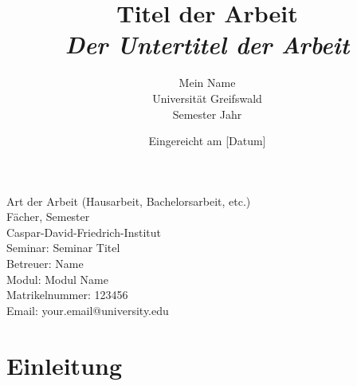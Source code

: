 \documentclass[12pt,a4paper]{article} %
\begin{document}
		
	
	\title{\LARGE{Titel der Arbeit} \\ \Large\itshape{Der Untertitel der Arbeit}}
	\author{{Mein Name} \\ {Universität Greifswald} \\ {Semester Jahr}}
	\date{Eingereicht am [Datum]}
	
	\maketitle
	\vspace*{\fill}
	\begin{flushleft}
		Art der Arbeit (Hausarbeit, Bachelorsarbeit, etc.)\\
		Fächer, Semester \\
		Caspar-David-Friedrich-Institut \\
		Seminar: Seminar Titel \\
		Betreuer: Name \\
		Modul: Modul Name \\
		Matrikelnummer: 123456 \\
		Email: your.email@university.edu
	\end{flushleft}
	\newpage
	
	
	\pagestyle{fancy}
	\fancyhf{}
	\fancyfoot[R]{\thepage} 
	\renewcommand{\headrulewidth}{0pt} 
	
	\tableofcontents
	\newpage
	
	
	\onehalfspacing %
	
	\section{Einleitung}
	
\end{document}
